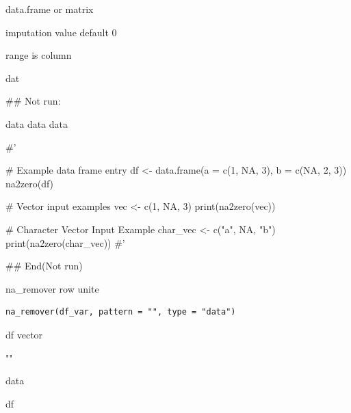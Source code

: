 \documentclass[a4paper]{book}
\begin{document}
%
\begin{Arguments}
\begin{ldescription}
\item[\code{data}] data.frame or matrix

\item[\code{imp}] imputation value default 0

\item[\code{range}] range is column
\end{ldescription}
\end{Arguments}
%
\begin{Value}
dat
\end{Value}
%
\begin{Examples}
\begin{ExampleCode}

\#\# Not run: 

data %
data %
data %

#'

# Example data frame entry
df <- data.frame(a = c(1, NA, 3), b = c(NA, 2, 3))
na2zero(df)

# Vector input examples
vec <- c(1, NA, 3)
print(na2zero(vec))

# Character Vector Input Example
char_vec <- c("a", NA, "b")
print(na2zero(char_vec))
#'


## End(Not run)

\end{ExampleCode}
\end{Examples}
%
\begin{Description}
na\_remover row unite
\end{Description}
%
\begin{Usage}
\begin{verbatim}
na_remover(df_var, pattern = "", type = "data")
\end{verbatim}
\end{Usage}
%
\begin{Arguments}
\begin{ldescription}
\item[\code{df\_var}] df vector

\item[\code{pattern}] ""

\item[\code{type}] data
\end{ldescription}
\end{Arguments}
%
\begin{Value}
df
\end{Value}
\end{document}
